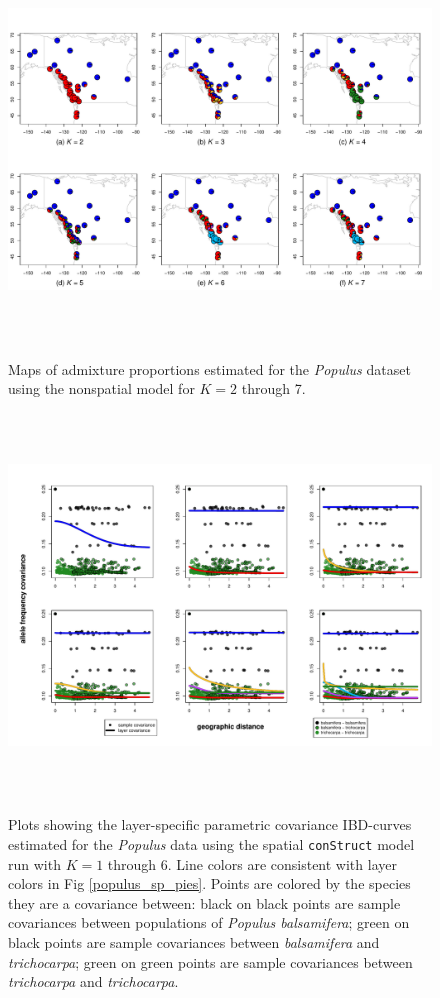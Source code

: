 \documentclass[10pt,letterpaper]{article}
\newcommand{\tri}{\textit{trichocarpa}}
\newcommand{\bals}{\textit{balsamifera}}
\begin{document}
\begin{figure}
	\centering
		{\includegraphics[width=6in,height=4in]{figs/populus/populus_nsp_pies.pdf}}
	\caption{
	Maps of admixture proportions estimated for the \textit{Populus} dataset 
	using the nonspatial model for $K=2$ through 7.
    }\label{populus_nsp_pies}
\end{figure}

\begin{figure}
	\centering
		{\includegraphics[width=6in,height=4in]{figs/populus/populus_sp_layer_covs.pdf}}
	\caption{
	Plots showing the layer-specific parametric covariance IBD-curves 
	estimated for the \textit{Populus} data using 
	the spatial \texttt{conStruct} model run with $K=1$ through 6.
	Line colors are consistent with layer colors in Fig \ref{populus_sp_pies}.
	Points are colored by the species they are a covariance between:
	black on black points are sample covariances between populations of \textit{Populus balsamifera};
	green on black points are sample covariances between \bals{} and \tri{};
	green on green points are sample covariances between \tri{} and \tri{}.
    }\label{populus_sp_layer_covs}
\end{figure}
\end{document}
